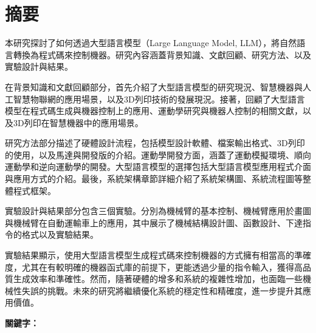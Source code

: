 \documentclass[class=NCU_thesis, crop=false]{standalone}
\begin{document}
\chapter{摘要}

本研究探討了如何透過大型語言模型（Large Language Model, LLM），將自然語言轉換為程式碼來控制機器。研究內容涵蓋背景知識、文獻回顧、研究方法、以及實驗設計與結果。

在背景知識和文獻回顧部分，首先介紹了大型語言模型的研究現況、智慧機器與人工智慧物聯網的應用場景，以及3D列印技術的發展現況。接著，回顧了大型語言模型在程式碼生成與機器控制上的應用、運動學研究與機器人控制的相關文獻，以及3D列印在智慧機器中的應用場景。

研究方法部分描述了硬體設計流程，包括模型設計軟體、檔案輸出格式、3D列印的使用，以及馬達與開發版的介紹。運動學開發方面，涵蓋了運動模擬環境、順向運動學和逆向運動學的開發。大型語言模型的選擇包括大型語言模型應用程式介面與應用方式的介紹。最後，系統架構章節詳細介紹了系統架構圖、系統流程圖等整體程式框架。

實驗設計與結果部分包含三個實驗。分別為機械臂的基本控制、機械臂應用於畫圖與機械臂在自動運輸車上的應用，其中展示了機械結構設計圖、函數設計、下達指令的格式以及實驗結果。

實驗結果顯示，使用大型語言模型生成程式碼來控制機器的方式擁有相當高的準確度，尤其在有較明確的機器函式庫的前提下，更能透過少量的指令輸入，獲得高品質生成效率和準確性。然而，隨著硬體的增多和系統的複雜性增加，也面臨一些機械性失誤的挑戰。未來的研究將繼續優化系統的穩定性和精確度，進一步提升其應用價值。

\vspace{2em}
\noindent \textbf{關鍵字：} \keywordsZh{} %
\end{document}
